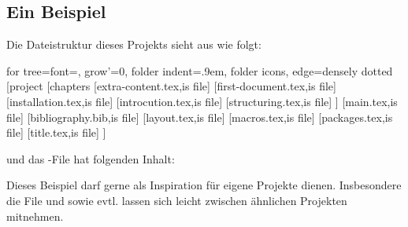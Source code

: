 \subsection{Ein Beispiel}
Die Dateistruktur dieses Projekts sieht aus wie folgt:
\begin{center}
	\begin{forest}
	for tree={font=\sffamily, grow'=0,
	folder indent=.9em, folder icons,
	edge=densely dotted}
	[project
		[chapters
			[extra-content.tex,is file]
			[first-document.tex,is file]
			[installation.tex,is file]
			[introcution.tex,is file]
			[structuring.tex,is file]
		]
		[main.tex,is file]
		[bibliography.bib,is file]
		[layout.tex,is file]
		[macros.tex,is file]
		[packages.tex,is file]
		[title.tex,is file]
	]
	\end{forest}
\end{center}
und das -File hat folgenden Inhalt:
Dieses Beispiel darf gerne als Inspiration für eigene Projekte dienen.
Insbesondere die File  und  sowie evtl.  lassen sich leicht zwischen ähnlichen Projekten mitnehmen.
